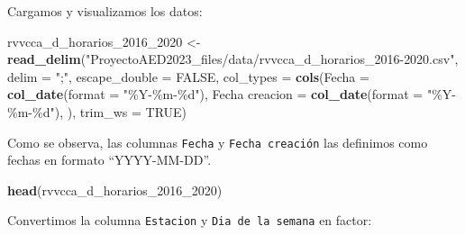 \documentclass[
]{article}
\newenvironment{Shaded}{\begin{snugshade}}{\end{snugshade}}
\newcommand{\AttributeTok}[1]{\textcolor[rgb]{0.13,0.29,0.53}{#1}}
\newcommand{\ConstantTok}[1]{\textcolor[rgb]{0.56,0.35,0.01}{#1}}
\newcommand{\FunctionTok}[1]{\textcolor[rgb]{0.13,0.29,0.53}{\textbf{#1}}}
\newcommand{\NormalTok}[1]{#1}
\newcommand{\OtherTok}[1]{\textcolor[rgb]{0.56,0.35,0.01}{#1}}
\newcommand{\SpecialCharTok}[1]{\textcolor[rgb]{0.81,0.36,0.00}{\textbf{#1}}}
\newcommand{\StringTok}[1]{\textcolor[rgb]{0.31,0.60,0.02}{#1}}
\begin{document}
Cargamos y visualizamos los datos:

\begin{Shaded}
\begin{Highlighting}[]
\NormalTok{rvvcca\_d\_horarios\_2016\_2020 }\OtherTok{\textless{}{-}} 
  \FunctionTok{read\_delim}\NormalTok{(}\StringTok{"ProyectoAED2023\_files/data/rvvcca\_d\_horarios\_2016{-}2020.csv"}\NormalTok{,}
  \AttributeTok{delim =} \StringTok{";"}\NormalTok{, }\AttributeTok{escape\_double =} \ConstantTok{FALSE}\NormalTok{, }
  \AttributeTok{col\_types =} \FunctionTok{cols}\NormalTok{(}\AttributeTok{Fecha =} \FunctionTok{col\_date}\NormalTok{(}\AttributeTok{format =} \StringTok{"\%Y{-}\%m{-}\%d"}\NormalTok{), }
  \StringTok{\textasciigrave{}}\AttributeTok{Fecha creacion}\StringTok{\textasciigrave{}} \OtherTok{=} \FunctionTok{col\_date}\NormalTok{(}\AttributeTok{format =} \StringTok{"\%Y{-}\%m{-}\%d"}\NormalTok{), ), }\AttributeTok{trim\_ws =} \ConstantTok{TRUE}\NormalTok{) }
\end{Highlighting}
\end{Shaded}

Como se observa, las columnas \texttt{Fecha} y \texttt{Fecha\ creación}
las definimos como fechas en formato ``YYYY-MM-DD''.

\begin{Shaded}
\begin{Highlighting}[]
\FunctionTok{head}\NormalTok{(rvvcca\_d\_horarios\_2016\_2020)}
\end{Highlighting}
\end{Shaded}

Convertimos la columna \texttt{Estacion} y \texttt{Dia\ de\ la\ semana}
en factor:

\begin{Shaded}
\end{Shaded}
\end{document}
